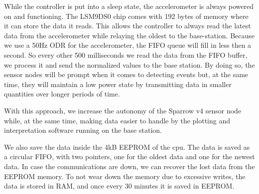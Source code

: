 While the controller is put into a sleep state, the accelerometer is always powered on and functioning. The LSM9DS0 chip comes with 192 bytes of memory where it can store the data it reads. This allows the controller to always read the latest data from the accelerometer while relaying the oldest to the base-station. Because we use a 50Hz ODR for the accelerometer, the FIFO queue will fill in less then a second. So every other 500 milliseconds we read the data from the FIFO buffer, we process it and send the normalized values to the base station. By doing so, the sensor nodes will be prompt when it comes to detecting events but, at the same time, they will maintain a low power state by transmitting data in smaller quantities over longer periods of time.

With this approach, we increase the autonomy of the Sparrow v4 sensor node while, at the same time, making data easier to handle by the plotting and interpretation software running 
on the base station.

We also save the data inside the 4kB EEPROM of the cpu. The data is saved as a circular FIFO, with
two pointers, one for the oldest data and one for the newest data. In case the communications are
down, we can recover the lost data from the EEPROM memory. To not wear down the memory due to
excessive writes, the data is stored in RAM, and once every 30 minutes it is saved in EEPROM.
